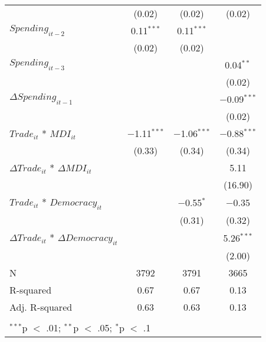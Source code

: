 \begin{table}[!htbp]
\begin{tabular}{@{\extracolsep{5pt}}lccc}
  & (0.02) & (0.02) & (0.02) \\ 
  $Spending_{it-2}$ & 0.11$^{***}$ & 0.11$^{***}$ &  \\ 
  & (0.02) & (0.02) &  \\ 
  $Spending_{it-3}$ &  &  & 0.04$^{**}$ \\ 
  &  &  & (0.02) \\ 
  $\Delta Spending_{it-1}$ &  &  & $-$0.09$^{***}$ \\ 
  &  &  & (0.02) \\ 
  $Trade_{it}$ * $MDI_{it}$ & $-$1.11$^{***}$ & $-$1.06$^{***}$ & $-$0.88$^{***}$ \\ 
  & (0.33) & (0.34) & (0.34) \\ 
  $\Delta Trade_{it}$ * $\Delta MDI_{it}$ &  &  & 5.11 \\ 
  &  &  & (16.90) \\ 
  $Trade_{it}$ * $Democracy_{it}$ &  & $-$0.55$^{*}$ & $-$0.35 \\ 
  &  & (0.31) & (0.32) \\ 
  $\Delta Trade_{it}$ * $\Delta Democracy_{it}$ &  &  & 5.26$^{***}$ \\ 
  &  &  & (2.00) \\ 
 N & 3792 & 3791 & 3665 \\ 
R-squared & 0.67 & 0.67 & 0.13 \\ 
Adj. R-squared & 0.63 & 0.63 & 0.13 \\ 
\hline \\[-1.8ex] 
\multicolumn{4}{l}{$^{***}$p $<$ .01; $^{**}$p $<$ .05; $^{*}$p $<$ .1} \\ 
\end{tabular} 
\end{table} 
